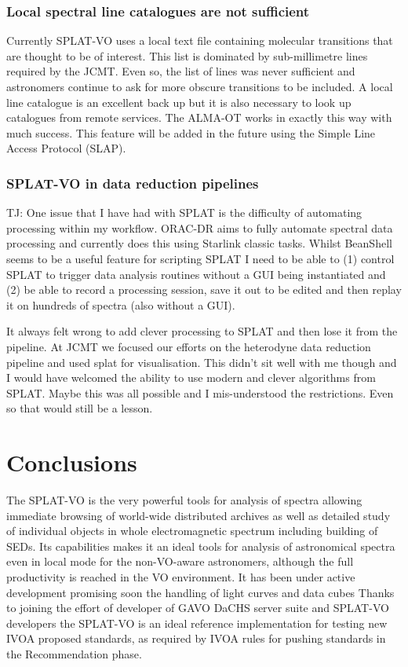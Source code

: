 \documentclass[final,authoryear,5p,times,twocolumn]{elsarticle}
\begin{document}
\subsubsection{Local spectral line catalogues are not sufficient}

Currently SPLAT-VO uses a local text file containing molecular
transitions that are thought to be of interest. This list is dominated
by sub-millimetre lines required by the JCMT. Even so, the list of
lines was never sufficient and astronomers continue to ask for more
obscure transitions to be included. A local line catalogue is an
excellent back up but it is also necessary to look up catalogues from
remote services. The ALMA-OT \citep{2013ASPC..475..373W} works in
exactly this way with much success. This feature will be added in the
future using the Simple Line Access Protocol (SLAP).

\subsubsection{SPLAT-VO in data reduction pipelines}

{\color{red}

TJ: One issue that I have had with SPLAT is the difficulty of
automating processing within my workflow. ORAC-DR aims to fully
automate spectral data processing and currently does this using
Starlink classic tasks. Whilst BeanShell seems to be a useful feature
for scripting SPLAT I need to be able to (1) control SPLAT to trigger data
analysis routines without a GUI being instantiated and (2) be able to
record a processing session, save it out to be edited and then replay
it on hundreds of spectra (also without a GUI).

It always felt wrong to add clever processing to SPLAT and then lose
it from the pipeline. At JCMT we focused our efforts on the heterodyne
data reduction pipeline and used splat for visualisation. This didn't
sit well with me though and I would have welcomed the ability to use
modern and clever algorithms from SPLAT. Maybe this was all possible
and I mis-understood the restrictions. Even so that would still be a lesson.

}

\section{Conclusions}

The SPLAT-VO is the very powerful tools for analysis of spectra
allowing immediate browsing of world-wide distributed archives as well
as detailed study of individual objects in whole electromagnetic
spectrum including building of SEDs. Its capabilities makes it an
ideal tools for analysis of astronomical spectra even in local mode
for the non-VO-aware astronomers, although the full productivity is
reached in the VO environment.  It has been under active development
promising soon the handling of light curves and data cubes Thanks to
joining the effort of developer of GAVO DaCHS server suite and
SPLAT-VO developers the SPLAT-VO is an ideal reference implementation
for testing new IVOA proposed standards, as required by IVOA rules for
pushing standards in the Recommendation phase.
\end{document}
